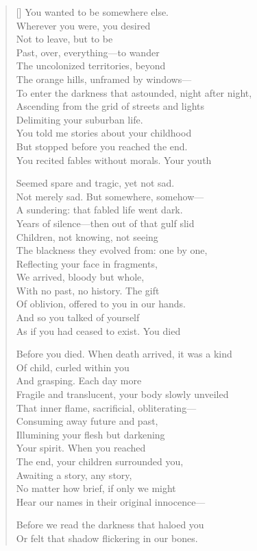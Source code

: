 \label{ch:deathinlife}
\settowidth{\versewidth}{To enter the darkness that astounded, night after night,}
\begin{verse}[\versewidth]
You wanted to be somewhere else.\\
Wherever you were, you desired\\
Not to leave, but to be\\
Past, over, everything---to wander\\
The uncolonized territories, beyond \\
The orange hills, unframed by windows---\\
To enter the darkness that astounded, night after night,\\
Ascending from the grid of streets and lights\\
Delimiting your suburban life.\\
You told me stories about your childhood\\
But stopped before you reached the end.\\
You recited fables without morals.  Your youth

Seemed spare and tragic, yet not sad.\\
Not merely sad.  But somewhere, somehow---\\
A sundering: that fabled life went dark.\\
Years of silence---then out of that gulf slid\\
Children, not knowing, not seeing\\
The blackness they evolved from: one by one,\\
Reflecting your face in fragments,\\
We arrived, bloody but whole,\\
With no past, no history.  The gift\\
Of oblivion, offered to you in our hands.\\
And so you talked of yourself\\
As if you had ceased to exist.	You died

Before you died.   When death arrived, it was a kind\\
Of child, curled within you\\
And grasping.   Each day more\\
Fragile and translucent, your body slowly unveiled\\
That inner flame, sacrificial, obliterating---\\
Consuming away future and past, \\
Illumining your flesh but darkening\\
Your spirit. When you reached\\
The end, your children surrounded you,\\
Awaiting a story, any story,\\
No matter how brief, if only we might\\
Hear our names in their original innocence---

Before we read the darkness that haloed you\\
Or felt that shadow flickering in our bones.
\end{verse}
